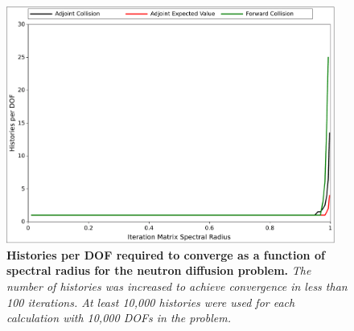 \begin{figure}[t!]
  \begin{center}
    \includegraphics[width=4.25in]{chapters/spn_equations/breakdown_histories.pdf}
  \end{center}
  \caption{\textbf{Histories per DOF required to converge as a
      function of spectral radius for the neutron diffusion problem.}
    \textit{The number of histories was increased to achieve
      convergence in less than 100 iterations. At least 10,000
      histories were used for each calculation with 10,000 DOFs in the
      problem.}}
  \label{fig:breakdown_histories}
\end{figure}


